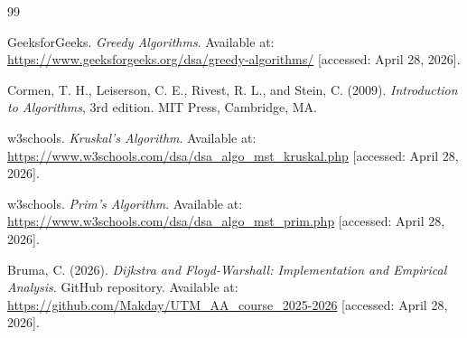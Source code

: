 \documentclass[12pt, a4paper]{report}
\begin{document}
\begin{thebibliography}{99}
\thispagestyle{plain}

  GeeksforGeeks. \textit{Greedy Algorithms}.
  Available at: \url{https://www.geeksforgeeks.org/dsa/greedy-algorithms/}
  [accessed: April 28, 2026].

  Cormen, T. H., Leiserson, C. E., Rivest, R. L., and Stein, C. (2009).
  \textit{Introduction to Algorithms}, 3rd edition.
  MIT Press, Cambridge, MA.

  w3schools. \textit{Kruskal's Algorithm}.
  Available at: \url{https://www.w3schools.com/dsa/dsa_algo_mst_kruskal.php}
  [accessed: April 28, 2026].

  w3schools. \textit{Prim's Algorithm}.
  Available at: \url{https://www.w3schools.com/dsa/dsa_algo_mst_prim.php}
  [accessed: April 28, 2026].

  Bruma, C. (2026). \textit{Dijkstra and Floyd-Warshall: Implementation and Empirical Analysis}.
  GitHub repository. 
  Available at: \url{https://github.com/Makday/UTM_AA_course_2025-2026}
  [accessed: April 28, 2026].

\end{thebibliography}
\end{document}
